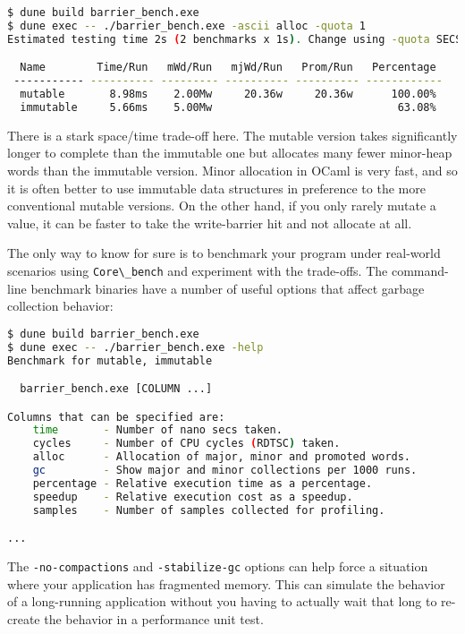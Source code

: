 \begin{lstlisting}[language=bash]
$ dune build barrier_bench.exe
$ dune exec -- ./barrier_bench.exe -ascii alloc -quota 1
Estimated testing time 2s (2 benchmarks x 1s). Change using -quota SECS.

  Name        Time/Run   mWd/Run   mjWd/Run   Prom/Run   Percentage
 ----------- ---------- --------- ---------- ---------- ------------
  mutable       8.98ms    2.00Mw     20.36w     20.36w      100.00%
  immutable     5.66ms    5.00Mw                             63.08%
\end{lstlisting}

There is a stark space/time trade-off here. The mutable version takes
significantly longer to complete than the immutable one but allocates
many fewer minor-heap words than the immutable version. Minor allocation
in OCaml is very fast, and so it is often better to use immutable data
structures in preference to the more conventional mutable versions. On
the other hand, if you only rarely mutate a value, it can be faster to
take the write-barrier hit and not allocate at all.

The only way to know for sure is to benchmark your program under
real-world scenarios using \passthrough{\lstinline!Core\_bench!} and
experiment with the trade-offs. The command-line benchmark binaries have
a number of useful options that affect garbage collection behavior:

\begin{lstlisting}[language=bash]
$ dune build barrier_bench.exe
$ dune exec -- ./barrier_bench.exe -help
Benchmark for mutable, immutable

  barrier_bench.exe [COLUMN ...]

Columns that can be specified are:
    time       - Number of nano secs taken.
    cycles     - Number of CPU cycles (RDTSC) taken.
    alloc      - Allocation of major, minor and promoted words.
    gc         - Show major and minor collections per 1000 runs.
    percentage - Relative execution time as a percentage.
    speedup    - Relative execution cost as a speedup.
    samples    - Number of samples collected for profiling.

...
\end{lstlisting}

The \passthrough{\lstinline!-no-compactions!} and
\passthrough{\lstinline!-stabilize-gc!} options can help force a
situation where your application has fragmented memory. This can
simulate the behavior of a long-running application without you having
to actually wait that long to re-create the behavior in a performance
unit test. ~

